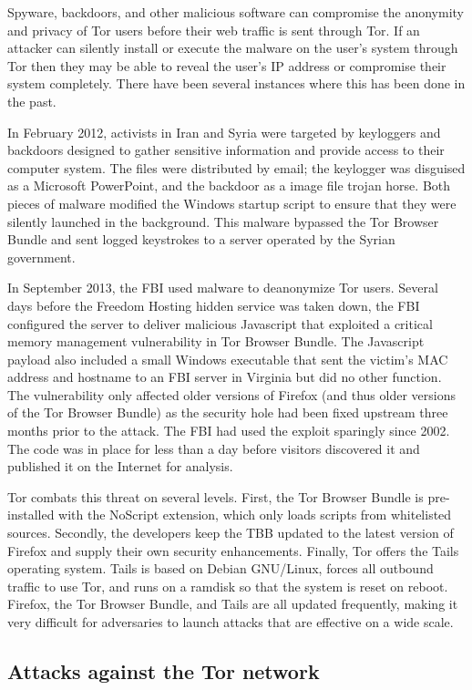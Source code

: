 \documentclass[journal]{IEEEtran}
\begin{document}
Spyware, backdoors, and other malicious software can compromise the anonymity and privacy of Tor users before their web traffic is sent through Tor. If an attacker can silently install or execute the malware on the user's system through Tor then they may be able to reveal the user's IP address or compromise their system completely. There have been several instances where this has been done in the past.

In February 2012, activists in Iran and Syria were targeted by keyloggers and backdoors designed to gather sensitive information and provide access to their computer system. The files were distributed by email; the keylogger was disguised as a Microsoft PowerPoint, and the backdoor as a image file trojan horse. Both pieces of malware modified the Windows startup script to ensure that they were silently launched in the background. This malware bypassed the Tor Browser Bundle and sent logged keystrokes to a server operated by the Syrian government.

In September 2013, the FBI used malware to deanonymize Tor users. Several days before the Freedom Hosting hidden service was taken down, the FBI configured the server to deliver malicious Javascript that exploited a critical memory management vulnerability in Tor Browser Bundle. The Javascript payload also included a small Windows executable that sent the victim's MAC address and hostname to an FBI server in Virginia but did no other function. The vulnerability only affected older versions of Firefox (and thus older versions of the Tor Browser Bundle) as the security hole had been fixed upstream three months prior to the attack. The FBI had used the exploit sparingly since 2002. The code was in place for less than a day before visitors discovered it and published it on the Internet for analysis.

Tor combats this threat on several levels. First, the Tor Browser Bundle is pre-installed with the NoScript extension, which only loads scripts from whitelisted sources. Secondly, the developers keep the TBB updated to the latest version of Firefox and supply their own security enhancements. Finally, Tor offers the Tails operating system. Tails is based on Debian GNU/Linux, forces all outbound traffic to use Tor, and runs on a ramdisk so that the system is reset on reboot. Firefox, the Tor Browser Bundle, and Tails are all updated frequently, making it very difficult for adversaries to launch attacks that are effective on a wide scale.

\subsection{Attacks against the Tor network}
\end{document}
